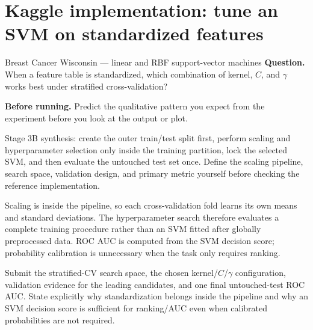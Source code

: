 \section{Kaggle implementation: tune an SVM on standardized features}
\label{sec:kaggle-breast-svm}

\begin{kaggleproject}{Breast Cancer Wisconsin --- linear and RBF support-vector machines}
\textbf{Question.} When a feature table is standardized, which combination of kernel, $C$, and $\gamma$ works best under stratified cross-validation?
\end{kaggleproject}

\textbf{Before running.} Predict the qualitative pattern you expect from the experiment before you look at the output or plot.

\begin{labmode}
Stage 3B synthesis: create the outer train/test split first, perform scaling and hyperparameter selection only inside the training partition, lock the selected SVM, and then evaluate the untouched test set once. Define the scaling pipeline, search space, validation design, and primary metric yourself before checking the reference implementation.
\end{labmode}




\begin{keyidea}
Scaling is inside the pipeline, so each cross-validation fold learns its own means and standard deviations. The hyperparameter search therefore evaluates a complete training procedure rather than an SVM fitted after globally preprocessed data. ROC AUC is computed from the SVM decision score; probability calibration is unnecessary when the task only requires ranking.
\end{keyidea}

\begin{labdeliverable}
Submit the stratified-CV search space, the chosen kernel/$C$/$\gamma$ configuration, validation evidence for the leading candidates, and one final untouched-test ROC AUC. State explicitly why standardization belongs inside the pipeline and why an SVM decision score is sufficient for ranking/AUC even when calibrated probabilities are not required.
\end{labdeliverable}
